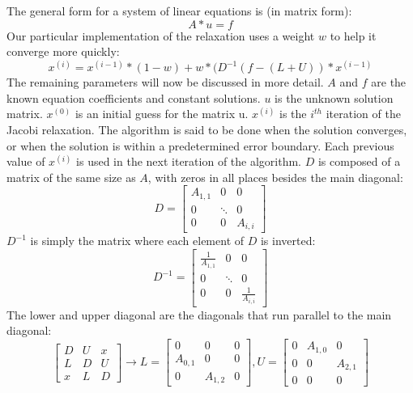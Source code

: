 \documentclass[10pt]{article}
\begin{document}
\begin{multicols}{2}
    The general form for a system of linear equations is (in matrix form):
    \[A*u=f\]
    Our particular implementation of the relaxation uses a weight \(w\) to help it converge more quickly:
    \[x^{(i)} = x^{(i-1)} * (1-w)+w*(D^{-1}(f-(L+U))*x^{(i-1)}\]
    The remaining parameters will now be discussed in more detail.
    \(A\) and \(f\) are the known equation coefficients and constant solutions.
    \(u\) is the unknown solution matrix.
    \(x^{(0)}\) is an initial guess for the matrix u.
    \(x^{(i)}\) is the \(i^{th}\) iteration of the Jacobi relaxation.
    The algorithm is said to be done when the solution converges, or when the solution is within a predetermined error boundary.
    Each previous value of \(x^{(i)}\) is used in the next iteration of the algorithm.
    \(D\) is composed of a matrix of the same size as \(A\), with zeros in all places besides the main diagonal:
    \[
        D =
        \begin{bmatrix*}
        A_{1,1}     & 0         & 0 \\
        0           & \ddots    & 0 \\
        0           & 0         & A_{i,i}
        \end{bmatrix*}
    \]
    \(D^{-1}\) is simply the matrix where each element of \(D\) is inverted:
    \[
        D^{-1} =
        \begin{bmatrix*}
        \frac{1}{A_{1,1}}   & 0         & 0 \\
        0                   & \ddots    & 0 \\
        0                   & 0         & \frac{1}{A_{i,i}}
        \end{bmatrix*}
    \]
    The lower and upper diagonal are the diagonals that run parallel to the main diagonal:
    \[
        \begin{bmatrix*}
        D & U & x \\
        L & D & U \\
        x & L & D
        \end{bmatrix*}
        \to
        L=
        \begin{bmatrix*}
        0 & 0               & 0 \\
        A_{0,1} & 0         & 0 \\
        0       & A_{1,2}   & 0
        \end{bmatrix*}
        ,
        U=
        \begin{bmatrix*}
        0 & A_{1,0} & 0       \\
        0 & 0       & A_{2,1} \\
        0 & 0       & 0
        \end{bmatrix*}
    \]
    

\end{multicols}
\end{document}
